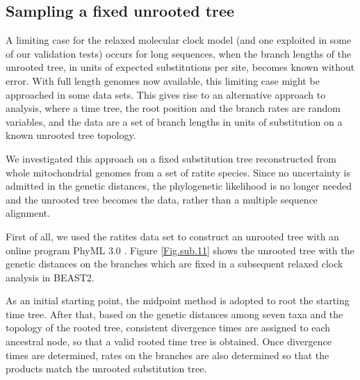 \documentclass{bmcart}
\newcommand{\alexei}[1]{{\textcolor{green}{#1}}}
\begin{document}
\subsection*{Sampling a fixed unrooted tree}

A limiting case for the relaxed molecular clock model (and one exploited in some of our validation tests) occurs for long sequences, when the branch lengths of the unrooted tree, in units of expected substitutions per site, becomes known without error.  With full length genomes now available, this limiting case might be approached in some data sets. This gives rise to an alternative approach to analysis, where a time tree, the root position and the branch rates are random variables, and the data are a set of branch lengths in units of substitution on a known unrooted tree topology. 

We investigated this approach on a fixed substitution tree reconstructed from whole mitochondrial genomes from a set of ratite species. Since no uncertainty is admitted in the genetic distances, the phylogenetic likelihood is no longer needed and the unrooted tree becomes the data, rather than a multiple sequence alignment. 

First of all, we used the ratites data set to construct an unrooted tree with an online program PhyML 3.0 \cite{phyml,guindon2010new}.  Figure \ref{Fig.sub.11} shows the unrooted tree with the genetic distances on the branches which are fixed in a subsequent relaxed clock analysis in BEAST2. 

As an initial starting point, the midpoint method is adopted to root the starting time tree. After that, based on the genetic distances among seven taxa and the topology of the rooted tree, consistent divergence times are assigned to each ancestral node, so that a valid rooted time tree is obtained. Once divergence times are determined, rates on the branches are also determined so that the products match the unrooted substitution tree. 
\end{document}
